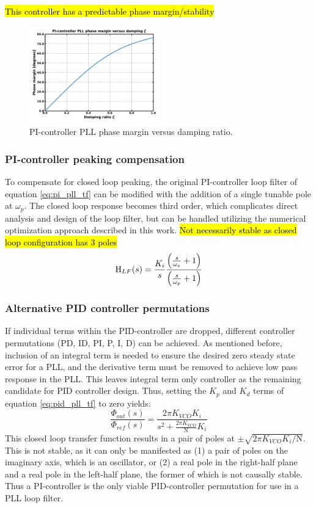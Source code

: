 			\hl{This controller has a predictable phase margin/stability}
			\begin{figure}[htb!]
				\center\includegraphics[width=0.5\textwidth, angle=0]{figs/damping_vs_pm.pdf}
				\caption{PI-controller PLL phase margin versus damping ratio.}
				\label{fig:phase_margin}
			\end{figure}

		\subsubsection{PI-controller peaking compensation}\label{comp_pi_pll_lf}
			 To compensate for closed loop peaking, the original PI-controller loop filter of equation \ref{eq:pi_pll_tf} can be modified with the addition of a single tunable pole at $\omega_p$. The closed loop response becomes third order, which complicates direct analysis and design of the loop filter, but can be handled utilizing the numerical optimization approach described in this work.
			 \hl{Not necessarily stable as closed loop configuration has 3 poles}
			\begin{equation} \label{eq:pi_compensated_tf}
				\textnormal{H}_{LF}(s) = \frac{K_i}{s}\frac{\left(\frac{s}{\omega_z} + 1\right)}{\left(\frac{s}{\omega_p} + 1\right)}
			\end{equation}

		\subsubsection{Alternative PID controller permutations} \label{other_pid}
			If individual terms within the PID-controller are dropped, different controller permutations (PD, ID, PI, P, I, D) can be achieved. As mentioned before, inclusion of an integral term is needed to ensure the desired zero steady state error for a PLL, and the derivative term must be removed to achieve low pass response in the PLL. This leaves integral term only controller as the remaining candidate for PID controller design. Thus, setting the $K_p$ and $K_d$ terms of equation \ref{eq:pid_pll_tf} to zero yields:
			\begin{equation}
				\frac{\Phi_{out}(s)}{\Phi_{ref}(s)} = \frac{2\pi K_{VCO}K_i}{s^2 + \frac{2\pi K_{VCO}}{\mathrm{N}}K_i}
			\end{equation}
			This closed loop transfer function results in a pair of poles at $\pm\sqrt{2\pi K_{VCO}K_i/\mathrm{N}}$. This is not stable, as it can only be manifested as (1) a pair of poles on the imaginary axis, which is an oscillator, or (2) a real pole in the right-half plane and a real pole in the left-half plane, the former of which is not causally stable. Thus a PI-controller is the only viable PID-controller permutation for use in a PLL loop filter. 


